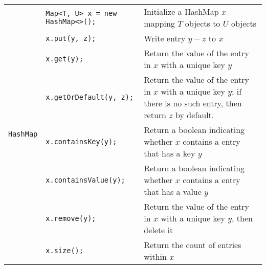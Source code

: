 \documentclass{article}
\begin{document}
\begin{center}
\begin{tabularx}{\textwidth}{llX}
  \multirow{8}{*}[-2em]{\lstinline|HashMap|} & \lstinline|Map<T, U> x = new HashMap<>();| & Initialize a HashMap \(x\) mapping \(T\) objects to \(U\) objects\\
                                       & \lstinline|x.put(y, z);| & Write entry \(y-z\) to \(x\)\\
                                       & \lstinline|x.get(y);| & Return the value of the entry in \(x\) with a unique key \(y\)\\
                                       & \lstinline|x.getOrDefault(y, z);| & Return the value of the entry in \(x\) with a unique key \(y\); if there is no such entry, then return \(z\) by default.\\
                                       & \lstinline|x.containsKey(y);| & Return a boolean indicating whether \(x\) contains a entry that has a key \(y\)\\
                                       & \lstinline|x.containsValue(y);| & Return a boolean indicating whether \(x\) contains a entry that has a value \(y\)\\
                                       & \lstinline|x.remove(y);| & Return the value of the entry in \(x\) with a unique key \(y\), then delete it\\
                                       & \lstinline|x.size();| & Return the count of entries within \(x\)
\\\bottomrule\end{tabularx}\end{center}





\end{document}
